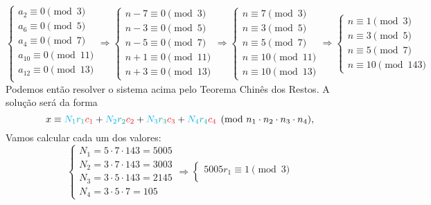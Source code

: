\documentclass[12pt, a4paper]{article}
\begin{document}
\begin{solution}
\[\begin{cases}
a_2 \equiv 0 \pmod 3 \\
a_6 \equiv 0 \pmod 5 \\
a_4 \equiv 0 \pmod 7  \\
a_{10} \equiv 0 \pmod{11} \\
a_{12} \equiv 0 \pmod{13} \\
\end{cases} \Rightarrow \begin{cases}
  n-7 \equiv 0 \pmod 3\\
n-3 \equiv 0 \pmod 5\\
n-5 \equiv 0 \pmod 7\\
 n+1 \equiv 0 \pmod{11}\\
n+3 \equiv 0 \pmod{13}
\end{cases} \Rightarrow \begin{cases}
  n \equiv 7 \pmod 3\\
n \equiv 3 \pmod 5\\
n \equiv 5 \pmod 7\\
 n \equiv 10 \pmod{11}\\
n \equiv 10 \pmod{13}
\end{cases} \Rightarrow \begin{cases}
  n \equiv 1 \pmod 3\\
n \equiv 3 \pmod 5\\
n \equiv 5 \pmod 7\\
 n \equiv 10 \pmod{143}
\end{cases}\]
Podemos então resolver o sistema acima pelo Teorema Chinês dos Restos. A solução será da forma
 \[x \equiv \textcolor{Cyan}{N_1}\textcolor{Emerald}{r_1}\textcolor{Red}{c_1} + \textcolor{Cyan}{N_2}\textcolor{Emerald}{r_2}\textcolor{Red}{c_2} + \textcolor{Cyan}{N_3}\textcolor{Emerald}{r_3}\textcolor{Red}{c_3}  + \textcolor{Cyan}{N_4}\textcolor{Emerald}{r_4}\textcolor{Red}{c_4} \pmod{n_1 \cdot n_2 \cdot n_3 \cdot n_4},\]
Vamos calcular cada um dos valores:
   $$\left\{ \begin{array}{l}
             N_1 = 5\cdot7 \cdot 143=5005\\
             N_2 = 3\cdot 7 \cdot 143=3003\\
             N_3 = 3 \cdot 5 \cdot 143=2145\\
             N_4 = 3 \cdot 5 \cdot 7=105
        \end{array}\right.\Rightarrow
        \left\{ \begin{array}{l}
             5005r_1 \equiv 1\pmod 3\\

\end{array}$$
\end{solution}
\end{document}
